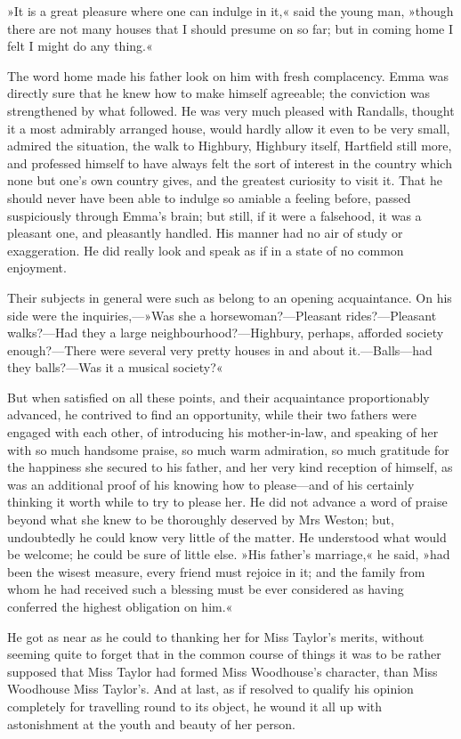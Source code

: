 »It is a great pleasure where one can indulge in it,« said the young man, »though there are not many houses that I should presume on so far; but in coming home I felt I might do any thing.«

The word home made his father look on him with fresh complacency. Emma was directly sure that he knew how to make himself agreeable; the conviction was strengthened by what followed. He was very much pleased with Randalls, thought it a most admirably arranged house, would hardly allow it even to be very small, admired the situation, the walk to Highbury, Highbury itself, Hartfield still more, and professed himself to have always felt the sort of interest in the country which none but one's own country gives, and the greatest curiosity to visit it. That he should never have been able to indulge so amiable a feeling before, passed suspiciously through Emma's brain; but still, if it were a falsehood, it was a pleasant one, and pleasantly handled. His manner had no air of study or exaggeration. He did really look and speak as if in a state of no common enjoyment.

Their subjects in general were such as belong to an opening acquaintance. On his side were the inquiries,—»Was she a horsewoman?—Pleasant rides?—Pleasant walks?—Had they a large neighbourhood?—Highbury, perhaps, afforded society enough?—There were several very pretty houses in and about it.—Balls—had they balls?—Was it a musical society?«

But when satisfied on all these points, and their acquaintance proportionably advanced, he contrived to find an opportunity, while their two fathers were engaged with each other, of introducing his mother-in-law, and speaking of her with so much handsome praise, so much warm admiration, so much gratitude for the happiness she secured to his father, and her very kind reception of himself, as was an additional proof of his knowing how to please—and of his certainly thinking it worth while to try to please her. He did not advance a word of praise beyond what she knew to be thoroughly deserved by Mrs Weston; but, undoubtedly he could know very little of the matter. He understood what would be welcome; he could be sure of little else. »His father's marriage,« he said, »had been the wisest measure, every friend must rejoice in it; and the family from whom he had received such a blessing must be ever considered as having conferred the highest obligation on him.«

He got as near as he could to thanking her for Miss Taylor's merits, without seeming quite to forget that in the common course of things it was to be rather supposed that Miss Taylor had formed Miss Woodhouse's character, than Miss Woodhouse Miss Taylor's. And at last, as if resolved to qualify his opinion completely for travelling round to its object, he wound it all up with astonishment at the youth and beauty of her person.

